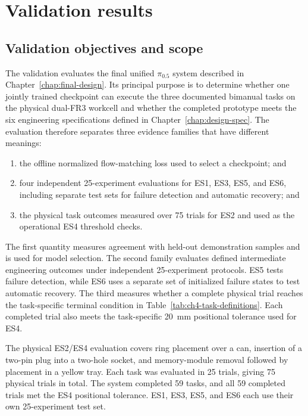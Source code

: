 \setlength{\emergencystretch}{2em}

\chapter{Validation results}\label{chap:validation}

\section{Validation objectives and scope}

The validation evaluates the final unified $\pi_{0.5}$ system described in Chapter~\ref{chap:final-design}. Its principal purpose is to determine whether one jointly trained checkpoint can execute the three documented bimanual tasks on the physical dual-FR3 workcell and whether the completed prototype meets the six engineering specifications defined in Chapter~\ref{chap:design-spec}. The evaluation therefore separates three evidence families that have different meanings:
\begin{enumerate}
  \item the offline normalized flow-matching loss used to select a checkpoint; and
  \item four independent 25-experiment evaluations for ES1, ES3, ES5, and ES6, including separate test sets for failure detection and automatic recovery; and
  \item the physical task outcomes measured over 75 trials for ES2 and used as the operational ES4 threshold checks.
\end{enumerate}
The first quantity measures agreement with held-out demonstration samples and is used for model selection. The second family evaluates defined intermediate engineering outcomes under independent 25-experiment protocols. ES5 tests failure detection, while ES6 uses a separate set of initialized failure states to test automatic recovery. The third measures whether a complete physical trial reaches the task-specific terminal condition in Table~\ref{tab:ch4-task-definitions}. Each completed trial also meets the task-specific 20~mm positional tolerance used for ES4.

The physical ES2/ES4 evaluation covers ring placement over a can, insertion of a two-pin plug into a two-hole socket, and memory-module removal followed by placement in a yellow tray. Each task was evaluated in 25 trials, giving 75 physical trials in total. The system completed 59 tasks, and all 59 completed trials met the ES4 positional tolerance. ES1, ES3, ES5, and ES6 each use their own 25-experiment test set.

